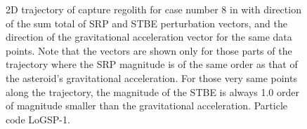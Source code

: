 \begin{figure}[htb]
\caption{2D trajectory of capture regolith for case number 8 in  with direction of the sum total of \gls{SRP} and \gls{STBE} perturbation vectors, and the direction of the gravitational acceleration vector for the same data points. Note that the vectors are shown only for those parts of the trajectory where the \gls{SRP} magnitude is of the same order as that of the asteroid's gravitational acceleration. For those very same points along the trajectory, the magnitude of the \gls{STBE} is always 1.0 order of magnitude smaller than the gravitational acceleration. Particle code LoGSP-1.}
\label{fig:LoGSP_1_capture_case_8_2d_trajectory_totalPerturbations_and_gravity_vectors}
\end{figure}
\FloatBarrier

